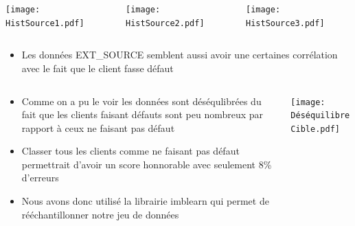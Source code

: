 \documentclass[8pt,aspectratio=169,hyperref={unicode=true}]{beamer}
\begin{document}
\begin{frame}{\insertsection}{\insertsubsection}
    \begin{columns}
        \begin{column}{.33\textwidth}
            \texttt{[image: HistSource1.pdf]}
        \end{column}
        \begin{column}{.33\textwidth}
            \texttt{[image: HistSource2.pdf]}
        \end{column}
        \begin{column}{.33\textwidth}
            \texttt{[image: HistSource3.pdf]}
        \end{column}
    \end{columns}
    \begin{itemize}
        \item Les données EXT\_SOURCE semblent aussi avoir une certaines corrélation avec le fait que le client fasse défaut
    \end{itemize}
\end{frame}

\begin{frame}{\insertsection}{\insertsubsection}
    \begin{columns}
        \begin{column}{.5\textwidth}
            \begin{itemize}
                \item Comme on a pu le voir les données sont déséqulibrées du fait que les clients faisant défauts sont peu nombreux par rapport à ceux ne faisant pas défaut
                \item Classer tous les clients comme ne faisant pas défaut permettrait d'avoir un score honnorable avec seulement 8\% d'erreurs
                \item Nous avons donc utilisé la librairie imblearn qui permet de rééchantillonner notre jeu de données
            \end{itemize}
        \end{column}
        \begin{column}{.5\textwidth}
            \texttt{[image: DéséquilibreCible.pdf]}
        \end{column}
    \end{columns}
\end{frame}
\end{document}
